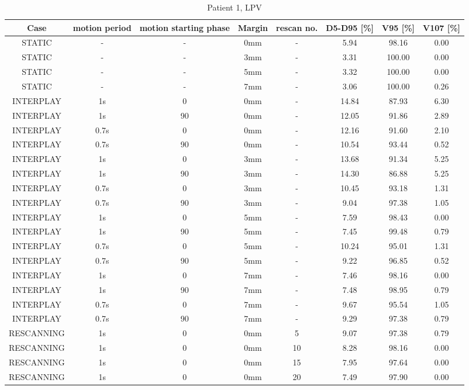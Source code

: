 \begin{table}[H]
  \centering
  \tiny
  \caption{Patient 1, LPV}
  \begin{tabular}{|c||c|c|c|c||c|c|c|}
    \hline\hline
    Case & motion period & motion starting phase & Margin & rescan no. & D5-D95 [\%] & V95 [\%] & V107 [\%] \\
    \hline 
STATIC & - & - & 0mm & - & 5.94 & 98.16 & 0.00 \\
STATIC & - & - & 3mm & - & 3.31 & 100.00 & 0.00 \\
STATIC & - & - & 5mm & - & 3.32 & 100.00 & 0.00 \\
STATIC & - & - & 7mm & - & 3.06 & 100.00 & 0.26 \\
INTERPLAY & 1s & 0 & 0mm & - & 14.84 & 87.93 & 6.30 \\
INTERPLAY & 1s & 90 & 0mm & - & 12.05 & 91.86 & 2.89 \\
INTERPLAY & 0.7s & 0 & 0mm & - & 12.16 & 91.60 & 2.10 \\
INTERPLAY & 0.7s & 90 & 0mm & - & 10.54 & 93.44 & 0.52 \\
INTERPLAY & 1s & 0 & 3mm & - & 13.68 & 91.34 & 5.25 \\
INTERPLAY & 1s & 90 & 3mm & - & 14.30 & 86.88 & 5.25 \\
INTERPLAY & 0.7s & 0 & 3mm & - & 10.45 & 93.18 & 1.31 \\
INTERPLAY & 0.7s & 90 & 3mm & - & 9.04 & 97.38 & 1.05 \\
INTERPLAY & 1s & 0 & 5mm & - & 7.59 & 98.43 & 0.00 \\
INTERPLAY & 1s & 90 & 5mm & - & 7.45 & 99.48 & 0.79 \\
INTERPLAY & 0.7s & 0 & 5mm & - & 10.24 & 95.01 & 1.31 \\
INTERPLAY & 0.7s & 90 & 5mm & - & 9.22 & 96.85 & 0.52 \\
INTERPLAY & 1s & 0 & 7mm & - & 7.46 & 98.16 & 0.00 \\
INTERPLAY & 1s & 90 & 7mm & - & 7.48 & 98.95 & 0.79 \\
INTERPLAY & 0.7s & 0 & 7mm & - & 9.67 & 95.54 & 1.05 \\
INTERPLAY & 0.7s & 90 & 7mm & - & 9.29 & 97.38 & 0.79 \\
RESCANNING & 1s & 0 & 0mm & 5 & 9.07 & 97.38 & 0.79 \\
RESCANNING & 1s & 0 & 0mm & 10 & 8.28 & 98.16 & 0.00 \\
RESCANNING & 1s & 0 & 0mm & 15 & 7.95 & 97.64 & 0.00 \\
RESCANNING & 1s & 0 & 0mm & 20 & 7.49 & 97.90 & 0.00 \\

\end{tabular}
\end{table}
